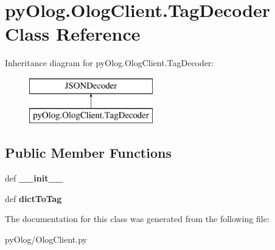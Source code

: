 \hypertarget{classpyOlog_1_1OlogClient_1_1TagDecoder}{\section{py\-Olog.\-Olog\-Client.\-Tag\-Decoder Class Reference}
\label{classpyOlog_1_1OlogClient_1_1TagDecoder}
}
Inheritance diagram for py\-Olog.\-Olog\-Client.\-Tag\-Decoder\-:\begin{figure}[H]
\begin{center}
\leavevmode
\includegraphics[height=2.000000cm]{classpyOlog_1_1OlogClient_1_1TagDecoder}
\end{center}
\end{figure}
\subsection*{Public Member Functions}
\begin{DoxyCompactItemize}
\item 
\hypertarget{classpyOlog_1_1OlogClient_1_1TagDecoder_a96a2f645cc53821489f000ffae923a24}{def {\bfseries \-\_\-\-\_\-init\-\_\-\-\_\-}}\label{classpyOlog_1_1OlogClient_1_1TagDecoder_a96a2f645cc53821489f000ffae923a24}

\item 
\hypertarget{classpyOlog_1_1OlogClient_1_1TagDecoder_a10d2ae673bfe6fef522d94257179af33}{def {\bfseries dict\-To\-Tag}}\label{classpyOlog_1_1OlogClient_1_1TagDecoder_a10d2ae673bfe6fef522d94257179af33}

\end{DoxyCompactItemize}


The documentation for this class was generated from the following file\-:\begin{DoxyCompactItemize}
\item 
py\-Olog/Olog\-Client.\-py\end{DoxyCompactItemize}
